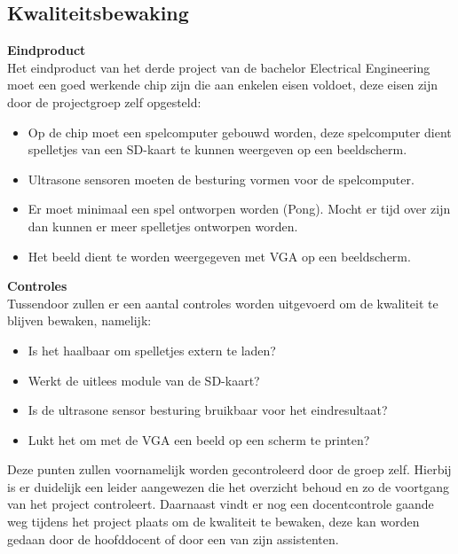 \documentclass[oneside,dutch]{tudelft-report}
\begin{document}
\subsection{Kwaliteitsbewaking}
\textbf{Eindproduct}\\
Het eindproduct van het derde project van de bachelor Electrical Engineering moet een goed werkende chip zijn die aan enkelen eisen voldoet, deze eisen zijn door de projectgroep zelf opgesteld:\
\begin{itemize}
\item Op de chip moet een spelcomputer gebouwd worden, deze spelcomputer dient spelletjes van een SD-kaart te kunnen weergeven op een beeldscherm.
\item Ultrasone sensoren moeten de besturing vormen voor de spelcomputer.
\item Er moet minimaal een spel ontworpen worden (Pong). Mocht er tijd over zijn dan kunnen er meer spelletjes ontworpen worden.
\item Het beeld dient te worden weergegeven met VGA op een beeldscherm.
\end{itemize}
\textbf{Controles}\\
Tussendoor zullen er een aantal controles worden uitgevoerd om de kwaliteit te blijven bewaken, namelijk:
\begin{itemize}
\item Is het haalbaar om spelletjes extern te laden?
\item Werkt de uitlees module van de SD-kaart?
\item Is de ultrasone sensor besturing bruikbaar voor het eindresultaat?
\item Lukt het om met de VGA een beeld op een scherm te printen? 
\end{itemize}
Deze punten zullen voornamelijk worden gecontroleerd door de groep zelf. Hierbij is er duidelijk een leider aangewezen die het overzicht behoud en zo de voortgang van het project controleert. Daarnaast vindt er nog een docentcontrole gaande weg tijdens het project plaats om de kwaliteit te bewaken, deze kan worden gedaan door de hoofddocent of door een van zijn assistenten.
\end{document}
